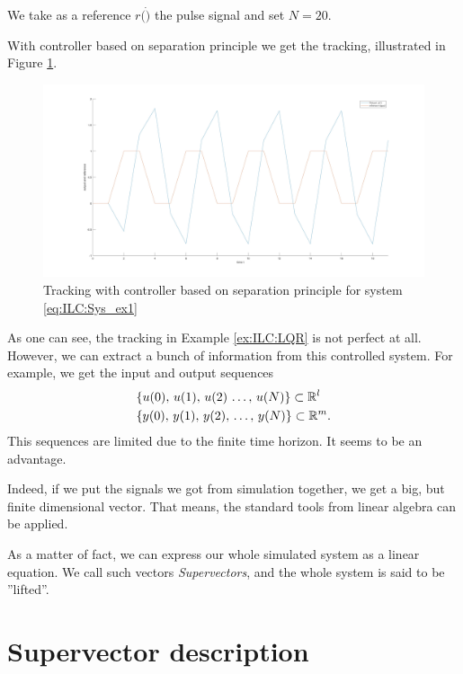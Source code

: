 \begin{example}
We take as a reference $r(\dot)$ the pulse signal and set $N = 20$. 

With controller based on separation principle we get the tracking, illustrated in  Figure \ref{img:ILC:LQR_control}.
\begin{figure}[ht]
	\label{img:ILC:LQR_control}
	\centering
	\includegraphics[width=\textwidth]{fig/LQR_ex.jpg}
	\caption{Tracking with controller based on separation principle for system \eqref{eq:ILC:Sys_ex1}}
\end{figure}
\end{example}



As one can see, the tracking in Example \ref{ex:ILC:LQR} is not perfect at all. However, we can extract a bunch of information from this controlled system. For example, we get the input and output sequences 
\begin{align}
&\{u(0), \, u(1), \,  u(2) \, \dots , \, u(N)\} \subset {\mathbb{R}}^l \label{eq:ILC:u_seq} \\
&\{y(0), \, y(1), \, y(2) , \, \dots , \, y(N)\}\subset {\mathbb{R}}^m.\label{eq:ILC:y_seq}
\end{align}
This sequences are limited due to the finite time horizon. It seems to be an advantage. 

Indeed, if we put the signals we got from simulation together, we get a big, but finite dimensional vector. That means, the standard tools from linear algebra can be applied. 

As a matter of fact, we can express our whole simulated system as a linear equation. We call such vectors \textit{Supervectors}, and the whole system is said to be ''lifted''.

\section{Supervector description} 


